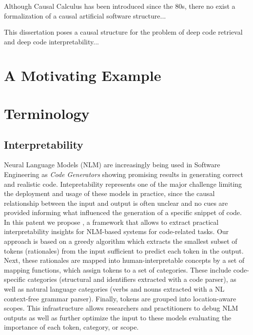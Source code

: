 Although Causal Calculus has been introduced since the 80s, there no exist a formalization of a causal artificial software structure...  

This dissertation poses a causal structure for the problem of deep code retrieval and deep code interpretability...







\section{A Motivating Example}

\section{Terminology}

\subsection{Interpretability}
Neural Language Models (NLM) are increasingly being used in Software Engineering as \textit{Code Generators} showing promising results in generating correct and realistic code. Intepretability represents one of the major challenge limiting the deployment and usage of these models in practice, since the causal relationship between the input and output is often unclear and no cues are provided informing what influenced the generation of a specific snippet of code. In this patent we propose \codeSeqRational, a framework that allows to extract practical interpretability insights for NLM-based systems for code-related tasks. Our approach is based on a greedy algorithm which extracts the smallest subset of tokens (rationales) from the input sufficient to predict each token in the output. Next, these rationales are mapped into human-interpretable concepts by a set of mapping functions, which assign tokens to a set of categories. These include code-specific categories (\ie structural and identifiers extracted with a code parser), as well as natural language categories (\eg verbs and nouns extracted with a NL context-free grammar parser). Finally, tokens are grouped into location-aware scopes. This infrastructure allows researchers and practitioners to debug NLM outputs as well as further optimize the input to these models evaluating the importance of each token, category, or scope.